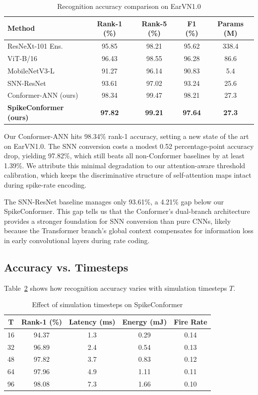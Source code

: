 \documentclass[11pt,a4paper]{article}
\begin{document}
\begin{table}[H]
\centering
\caption{Recognition accuracy comparison on EarVN1.0}
\label{tab:accuracy}
\begin{tabular}{@{}lcccc@{}}
\toprule
\textbf{Method} & \textbf{Rank-1 (\%)} & \textbf{Rank-5 (\%)} & \textbf{F1 (\%)} & \textbf{Params (M)} \\
\midrule
ResNeXt-101 Ens.~\cite{alshazly2020deep} & 95.85 & 98.21 & 95.62 & 338.4 \\
ViT-B/16~\cite{dosovitskiy2021image} & 96.43 & 98.55 & 96.28 & 86.6 \\
MobileNetV3-L~\cite{howard2019searching} & 91.27 & 96.14 & 90.83 & 5.4 \\
SNN-ResNet~\cite{li2021free} & 93.61 & 97.02 & 93.24 & 25.6 \\
Conformer-ANN (ours) & 98.34 & 99.47 & 98.21 & 27.3 \\
\textbf{SpikeConformer (ours)} & \textbf{97.82} & \textbf{99.21} & \textbf{97.64} & \textbf{27.3} \\
\bottomrule
\end{tabular}
\end{table}

Our Conformer-ANN hits 98.34\% rank-1 accuracy, setting a new state of the art on EarVN1.0. The SNN conversion costs a modest 0.52 percentage-point accuracy drop, yielding 97.82\%, which still beats all non-Conformer baselines by at least 1.39\%. We attribute this minimal degradation to our attention-aware threshold calibration, which keeps the discriminative structure of self-attention maps intact during spike-rate encoding.

The SNN-ResNet baseline manages only 93.61\%, a 4.21\% gap below our SpikeConformer. This gap tells us that the Conformer's dual-branch architecture provides a stronger foundation for SNN conversion than pure CNNs, likely because the Transformer branch's global context compensates for information loss in early convolutional layers during rate coding.

\subsection{Accuracy vs. Timesteps}

Table~\ref{tab:timesteps} shows how recognition accuracy varies with simulation timesteps $T$.

\begin{table}[H]
\centering
\caption{Effect of simulation timesteps on SpikeConformer}
\label{tab:timesteps}
\begin{tabular}{@{}ccccc@{}}
\toprule
\textbf{T} & \textbf{Rank-1 (\%)} & \textbf{Latency (ms)} & \textbf{Energy (mJ)} & \textbf{Fire Rate} \\
\midrule
16 & 94.37 & 1.3 & 0.29 & 0.14 \\
32 & 96.89 & 2.4 & 0.54 & 0.13 \\
48 & 97.82 & 3.7 & 0.83 & 0.12 \\
64 & 97.96 & 4.9 & 1.11 & 0.11 \\
96 & 98.08 & 7.3 & 1.66 & 0.10 \\
\bottomrule
\end{tabular}
\end{table}
\end{document}
